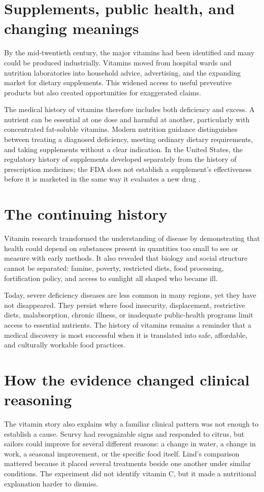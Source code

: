 \documentclass[12pt,oneside]{book}
\begin{document}
\section{Supplements, public health, and changing meanings}
By the mid-twentieth century, the major vitamins had been identified and many
could be produced industrially. Vitamins moved from hospital wards and nutrition
laboratories into household advice, advertising, and the expanding market for
dietary supplements. This widened access to useful preventive products but also
created opportunities for exaggerated claims.

The medical history of vitamins therefore includes both deficiency and excess.
A nutrient can be essential at one dose and harmful at another, particularly
with concentrated fat-soluble vitamins. Modern nutrition guidance distinguishes
between treating a diagnosed deficiency, meeting ordinary dietary requirements,
and taking supplements without a clear indication. In the United States, the
regulatory history of supplements developed separately from the history of
prescription medicines; the FDA does not establish a supplement's effectiveness
before it is marketed in the same way it evaluates a new drug
\cite{ods1997}.

\section{The continuing history}
Vitamin research transformed the understanding of disease by demonstrating that
health could depend on substances present in quantities too small to see or
measure with early methods. It also revealed that biology and social structure
cannot be separated: famine, poverty, restricted diets, food processing,
fortification policy, and access to sunlight all shaped who became ill.

Today, severe deficiency diseases are less common in many regions, yet they have
not disappeared. They persist where food insecurity, displacement, restrictive
diets, malabsorption, chronic illness, or inadequate public-health programs
limit access to essential nutrients. The history of vitamins remains a reminder
that a medical discovery is most successful when it is translated into safe,
affordable, and culturally workable food practices.

\section{How the evidence changed clinical reasoning}
The vitamin story also explains why a familiar clinical pattern was not enough
to establish a cause. Scurvy had recognizable signs and responded to citrus,
but sailors could improve for several different reasons: a change in water, a
change in work, a seasonal improvement, or the specific food itself. Lind's
comparison mattered because it placed several treatments beside one another
under similar conditions. The experiment did not identify vitamin C, but it
made a nutritional explanation harder to dismiss.
\end{document}
